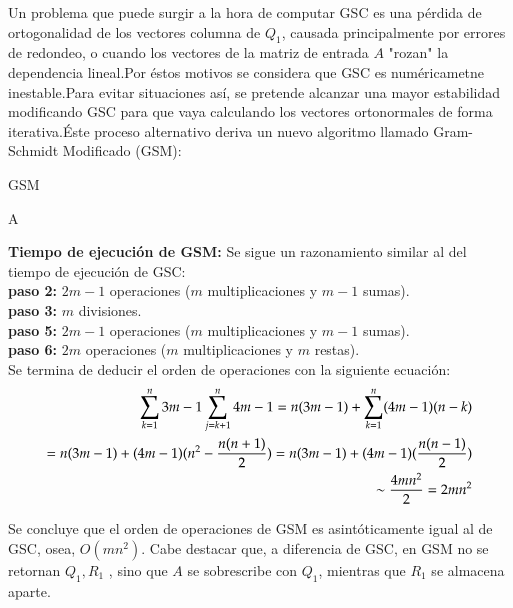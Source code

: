\documentclass{endm}
\begin{document}
Un problema que puede surgir a la hora de computar GSC es una p\'erdida de ortogonalidad de los vectores columna de $Q_1$, causada principalmente por errores de redondeo, o cuando los vectores de la matriz de entrada $A$ "rozan" la dependencia lineal.Por \'estos motivos se considera que GSC es num\'ericametne inestable.Para evitar situaciones as\'i, se pretende alcanzar una mayor estabilidad modificando GSC para que vaya calculando los vectores ortonormales de forma iterativa.\'Este proceso alternativo deriva un nuevo algoritmo llamado Gram-Schmidt Modificado (GSM):\\

\begin{algorithm}[H] 
\caption{GSM}\label{mgsalg}
\small
\centering
\begin{algorithmic}[1]
\Require A 
        \EndFor
    \EndFor
\end{algorithmic}
\end{algorithm}


\textbf{Tiempo de ejecuci\'on de GSM:} Se sigue un razonamiento similar al del tiempo de ejecuci\'on de GSC:\\
\textbf{paso 2:} $2m-1$ operaciones ($m$ multiplicaciones y $m-1$ sumas).\\
\textbf{paso 3:} $m$ divisiones.\\
\textbf{paso 5:} $2m-1$ operaciones ($m$ multiplicaciones y $m-1$ sumas).\\
\textbf{paso 6:} $2m$ operaciones ($m$ multiplicaciones y $m$ restas).\\
Se termina de deducir el orden de operaciones con la siguiente ecuaci\'on:\\
\begin{align*}
  \small
    \sum^{n}_{k=1} 3m-1 \sum^{n}_{j=k+1} 4m-1 = n(3m-1) + \sum^{n}_{k=1}(4m-1)(n-k) \\
     = n(3m-1) + (4m-1)(n^2-\frac{n(n+1)}{2}) = n(3m-1) + (4m-1)(\frac{n(n-1)}{2}) \\
     \sim \frac{4mn^2}{2}=2mn^2
\end{align*}

Se concluye que el orden de operaciones de GSM es asint\'oticamente igual al de GSC, osea, $O(mn^2)$.
Cabe destacar que, a diferencia de GSC, en GSM no se retornan $Q_1,R_1$ , sino que $A$ se sobrescribe con $Q_1$, mientras que $R_1$ se almacena aparte.\\
\end{document}
